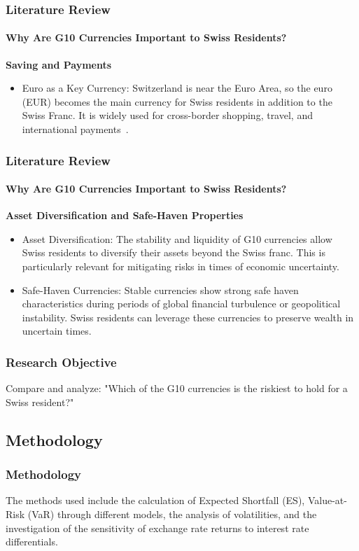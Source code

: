 \documentclass[10pt]{beamer}
\begin{document}
\begin{frame}
\frametitle{Literature Review}
\framesubtitle{Why Are G10 Currencies Important to Swiss Residents?}
\textbf{Saving and Payments}
\begin{itemize}
    \item Euro as a Key Currency: Switzerland is near the Euro Area, so the euro (EUR) becomes the main currency for Swiss residents in addition to the Swiss Franc. It is widely used for cross-border shopping, travel, and international payments~\cite{sif_imf_reports}.
\end{itemize}
\end{frame}
\begin{frame}
\frametitle{Literature Review}
\framesubtitle{Why Are G10 Currencies Important to Swiss Residents?}
\textbf{Asset Diversification and Safe-Haven Properties}   
\begin{itemize}
    \item Asset Diversification: The stability and liquidity of G10 currencies allow Swiss residents to diversify their assets beyond the Swiss franc. This is particularly relevant for mitigating risks in times of economic uncertainty.~\cite{ito2020currency}
    \item Safe-Haven Currencies: Stable currencies show strong safe haven characteristics during periods of global financial turbulence or geopolitical instability. Swiss residents can leverage these currencies to preserve wealth in uncertain times.~\cite{ranaldo2010safe}
\end{itemize}
\end{frame}
\begin{frame}
\frametitle{Research Objective}
Compare and analyze: "Which of the G10 currencies is the riskiest to hold for a Swiss resident?"
\end{frame}
\begin{frame}
\section{Methodology}
\frametitle{Methodology}
The methods used include the calculation of Expected Shortfall (ES), Value-at-Risk (VaR) through different models, the analysis of volatilities, and the investigation of the sensitivity of exchange rate returns to interest rate differentials.
\end{frame}
\end{document}

